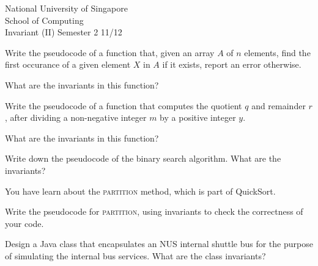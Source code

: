 \documentclass[answers,a4paper,11pt]{exam}
\begin{document}
\extraheadheight{.5in}
%
{\large\sf National University of Singapore\\ School of Computing \\
\LARGE\sf Invariant (II)}%
{\large\sf Semester 2 11/12}
\firstpageheadrule
\pagestyle{headandfoot}

\begin{questions}
\question
Write the pseudocode of a function that, given an array $A$ of $n$ elements, find the first occurance of a given element $X$ in $A$ if it exists, report an error otherwise.

What are the invariants in this function?

\fillwithdottedlines{5in}
\newpage
\question

Write the pseudocode of a function that computes the quotient $q$ and remainder $r$, after dividing a non-negative integer $m$ by a positive integer $y$.

What are the invariants in this function?

\fillwithdottedlines{5in}
\newpage
\question

Write down the pseudocode of the binary search algorithm. 
What are the invariants?

\fillwithdottedlines{5in}
\newpage
\question

You have learn about the \textsc{partition} method, which is part of QuickSort.

Write the pseudocode for \textsc{partition}, using invariants to check the correctness of your code.

\fillwithdottedlines{5in}

\newpage
\question

Design a Java class that encapsulates an NUS internal shuttle bus for the purpose of simulating the internal bus services.  What are the class invariants?

\fillwithdottedlines{5in}

\end{questions}
\end{document}
